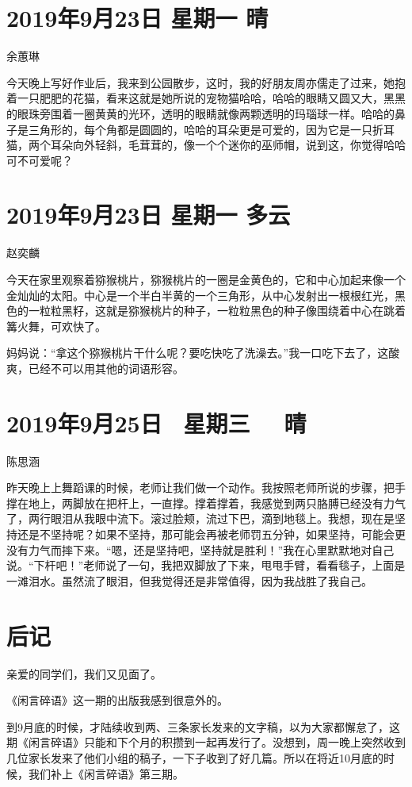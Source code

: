 \section{2019年9月23日 星期一 晴}

余蕙琳

今天晚上写好作业后，我来到公园散步，这时，我的好朋友周亦儒走了过来，她抱着一只肥肥的花猫，看来这就是她所说的宠物猫哈哈，哈哈的眼睛又圆又大，黑黑的眼珠旁围着一圈黄黄的光环，透明的眼睛就像两颗透明的玛瑙球一样。哈哈的鼻子是三角形的，每个角都是圆圆的，哈哈的耳朵更是可爱的，因为它是一只折耳猫，两个耳朵向外轻斜，毛茸茸的，像一个个迷你的巫师帽，说到这，你觉得哈哈可不可爱呢？

\section{2019年9月23日 星期一 多云}

赵奕麟

今天在家里观察着猕猴桃片，猕猴桃片的一圈是金黄色的，它和中心加起来像一个金灿灿的太阳。中心是一个半白半黄的一个三角形，从中心发射出一根根红光，黑色的一粒粒黑籽，这就是猕猴桃片的种子，一粒粒黑色的种子像围绕着中心在跳着篝火舞，可欢快了。

妈妈说：“拿这个猕猴桃片干什么呢？要吃快吃了洗澡去。”我一口吃下去了，这酸爽，已经不可以用其他的词语形容。

\section{2019年9月25日~ 星期三~~ 晴}

陈思涵

昨天晚上上舞蹈课的时候，老师让我们做一个动作。我按照老师所说的步骤，把手撑在地上，两脚放在把杆上，一直撑。撑着撑着，我感觉到两只胳膊已经没有力气了，两行眼泪从我眼中流下。滚过脸颊，流过下巴，滴到地毯上。我想，现在是坚持还是不坚持呢？如果不坚持，那可能会再被老师罚五分钟，如果坚持，可能会更没有力气而摔下来。“嗯，还是坚持吧，坚持就是胜利！”我在心里默默地对自己说。“下杆吧！”老师说了一句，我把双脚放了下来，甩甩手臂，看看毯子，上面是一滩泪水。虽然流了眼泪，但我觉得还是非常值得，因为我战胜了我自己。

\section{后记}
亲爱的同学们，我们又见面了。

《闲言碎语》这一期的出版我感到很意外的。

到9月底的时候，才陆续收到两、三条家长发来的文字稿，以为大家都懈怠了，这期《闲言碎语》只能和下个月的积攒到一起再发行了。没想到，周一晚上突然收到几位家长发来了他们小组的稿子，一下子收到了好几篇。所以在将近10月底的时候，我们补上《闲言碎语》第三期。

